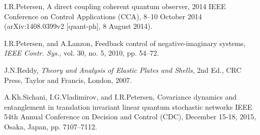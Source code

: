 \documentclass[letterpaper, 10pt, conference]{ieeeconf}  %
\begin{document}
\begin{thebibliography}{99}


I.R.Petersen,
A direct coupling coherent quantum observer,
2014 IEEE Conference on Control Applications (CCA),
8--10 October 2014 (arXiv:1408.0399v2 [quant-ph], 8 August 2014).

I.R.Petersen, and A.Lanzon,
Feedback control of negative-imaginary systems,
\textit{IEEE Contr. Sys.}, vol. 30, no. 5, 2010, pp. 54--72.



J.N.Reddy, \textit{Theory and Analysis of Elastic Plates and Shells}, 2nd Ed., CRC Press, Taylor and Francis, London, 2007.
%


A.Kh.Sichani, I.G.Vladimirov, and I.R.Petersen,
Covariance dynamics and entanglement in translation invariant linear quantum stochastic networks
IEEE 54th Annual Conference on Decision and Control (CDC),
December 15-18, 2015,  Osaka, Japan,
pp. 7107--7112.


\end{thebibliography}
\end{document}
